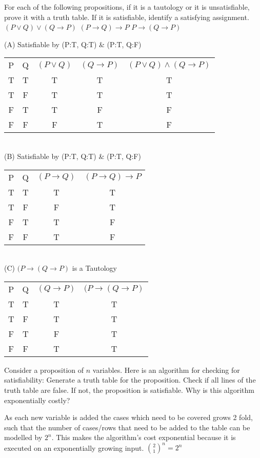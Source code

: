 \documentclass[solution,letterpaper]{cs20}
\begin{document}
\begin{problem}
For each of the following propositions, if it is a tautology or it is unsatisfiable, prove it with a truth table. If it is satisfiable, identify a satisfying assignment.
\subproblem $(P \vee Q) \vee (Q \to P)$
\subproblem $(P \to Q) \to P$
\subproblem $P \to (Q \to P)$

\begin{solution}
(A) Satisfiable by (P:T, Q:T) \& (P:T, Q:F) \\
\begin{tabular}{c|c|c|c|c|}
    P & Q & $(P \lor Q)$ & $(Q \to P)$ & $(P \lor Q) \land (Q \to P)$\\
    T & T & T & T & T\\
    T & F & T & T & T\\
    F & T & T & F & F\\
    F & F & F & T & F\\
\end{tabular}
\label{tab:my_label} \\

(B) Satisfiable by (P:T, Q:T) \& (P:T, Q:F) \\
\begin{tabular}{c|c|c|c|}
    P & Q & $(P \to Q)$ & $(P \to Q) \to P$ \\
    T & T & T & T \\
    T & F & F & T \\
    F & T & T & F \\
    F & F & T & F \\
\end{tabular} \\

(C) $(P \to (Q \to P)$ is a Tautology \\
\begin{tabular}{c|c|c|c}
     P & Q & $(Q \to P)$ & $(P \to (Q \to P)$ \\
     T & T & T & T \\
     T & F & T & T \\
     F & T & F & T \\
     F & F & T & T \\
\end{tabular}
\end{solution}
\end{problem}
\pagebreak

\begin{problem}
    Consider a proposition of $n$ variables. Here is an algorithm for checking for satisfiability: Generate a truth table for the proposition. Check if all lines of the truth table are false. If not, the proposition is satisfiable. Why is this algorithm exponentially costly?
    \begin{solution}
        As each new variable is added the cases which need to be covered grows 2 fold, such that the number of cases/rows that need to be added to the table can be modelled by $2^n$. This makes the algorithm's cost exponential because it is executed on an exponentially growing input.
        $\binom{2}{1}^n = 2^n$
    \end{solution}
\end{problem}
\pagebreak
\end{document}
